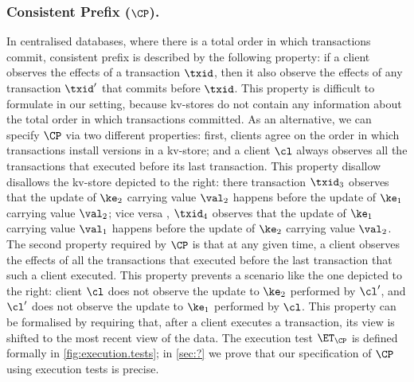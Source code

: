 
\subsubsection{Consistent Prefix ($\CP$).}
In centralised databases, where there is a total order in which transactions commit, 
consistent prefix is described  by the following property: if a client 
observes the effects of a transaction $\txid$, then it also observe the effects 
of any transaction $\txid'$ that commits before $\txid$. This property is 
difficult to formulate in our setting, because kv-stores do not contain any 
information about the total order in which transactions committed. 
As an alternative, we can specify $\CP$ via two different properties: 
first, clients agree on the 
order in which transactions install versions in a kv-store; and a client $\cl$ always 
observes all the transactions that executed before its last transaction. This property 
disallow disallows the kv-store depicted to the right: there 
transaction $\txid_{3}$ observes that the 
update of $\ke_2$ carrying value $\val_2$ happens before 
the update of $\ke_1$ carrying value $\val_2$; vice versa , 
$\txid_{4}$ observes that the update of $\ke_1$ carrying value $\val_1$ 
happens before the update of $\ke_2$ carrying value  $\val_2$. 
The second property required by $\CP$ is that at any given time, 
a client observes the effects of all the transactions that  
executed before the last transaction that such a client executed. 
This property prevents a scenario like the one depicted to the 
right: client $\cl$ does not observe the update to $\ke_2$ performed 
by $\cl'$, and $\cl'$ does not observe the update to $\ke_1$ performed 
by $\cl$. This property can be formalised by requiring that, after 
a client executes a transaction, its view is shifted to the most recent 
view of the data. The execution test $\ET_{\CP}$ is defined formally 
in \cref{fig:execution.tests}; in \cref{sec:?} we prove that our specification  
of $\CP$ using execution tests is precise. 



